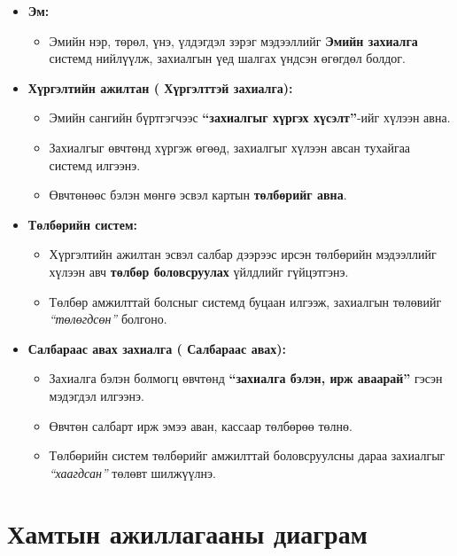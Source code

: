 \begin{itemize}
    \item \textbf{Эм:}
    \begin{itemize}
        \item Эмийн нэр, төрөл, үнэ, үлдэгдэл зэрэг мэдээллийг \textbf{Эмийн захиалга} системд нийлүүлж, захиалгын үед шалгах үндсэн өгөгдөл болдог.
    \end{itemize}

    \item \textbf{Хүргэлтийн ажилтан ( Хүргэлттэй захиалга):}
    \begin{itemize}
        \item Эмийн сангийн бүртгэгчээс \textbf{“захиалгыг хүргэх хүсэлт”}-ийг хүлээн авна.
        \item Захиалгыг өвчтөнд хүргэж өгөөд, захиалгыг хүлээн авсан тухайгаа системд илгээнэ.
        \item Өвчтөнөөс бэлэн мөнгө эсвэл картын \textbf{төлбөрийг авна}.
    \end{itemize}

    \item \textbf{Төлбөрийн систем:}
    \begin{itemize}
        \item Хүргэлтийн ажилтан эсвэл салбар дээрээс ирсэн төлбөрийн мэдээллийг хүлээн авч \textbf{төлбөр боловсруулах} үйлдлийг гүйцэтгэнэ.
        \item Төлбөр амжилттай болсныг системд буцаан илгээж, захиалгын төлөвийг \textit{“төлөгдсөн”} болгоно.
    \end{itemize}

    \item \textbf{Салбараас авах захиалга ( Салбараас авах):}
    \begin{itemize}
        \item Захиалга бэлэн болмогц өвчтөнд \textbf{“захиалга бэлэн, ирж аваарай”} гэсэн мэдэгдэл илгээнэ.
        \item Өвчтөн салбарт ирж эмээ аван, кассаар төлбөрөө төлнө.
        \item Төлбөрийн систем төлбөрийг амжилттай боловсруулсны дараа захиалгыг \textit{“хаагдсан”} төлөвт шилжүүлнэ.
    \end{itemize}
\end{itemize}

\section{Хамтын ажиллагааны диаграм}
